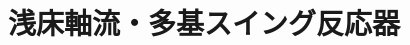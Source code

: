\documentclass[11pt,aspectratio=43,dvipsnames]{beamer}
\begin{document}
\setcounter{framenumber}{7}   %
\section{浅床軸流・多基スイング反応器}

\end{document}
